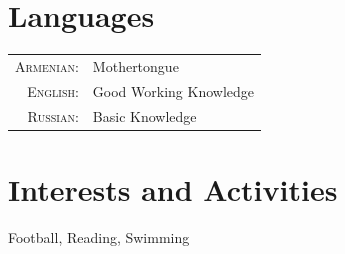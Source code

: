 \documentclass[a4paper,12pt]{article}
\begin{document}
\section{Languages}
\begin{tabular}{rl}
 \textsc{Armenian:}&Mothertongue\\
\textsc{English:}&Good Working Knowledge\\
\textsc{Russian:}&Basic Knowledge\\
\end{tabular}

\section{Interests and Activities}
Football, Reading, Swimming
\end{document}
